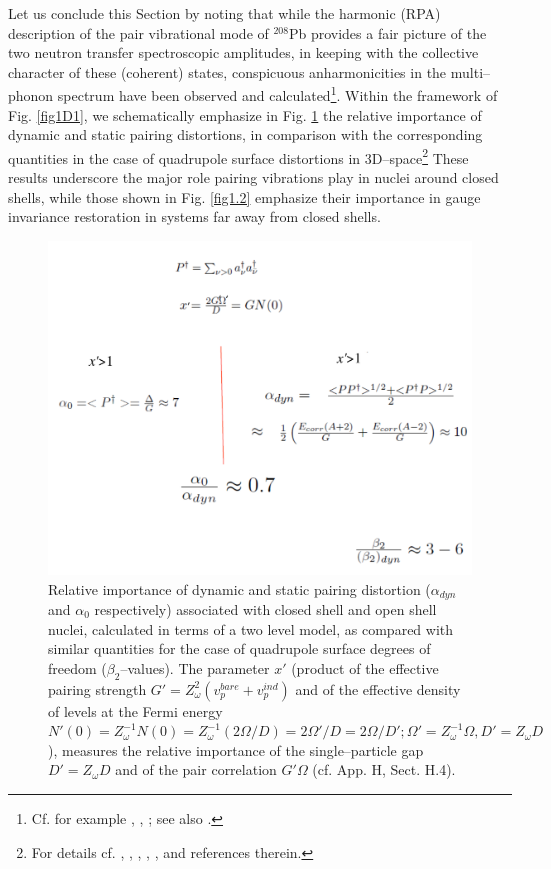 Let us conclude this Section by noting that while the harmonic (RPA) description of the pair vibrational mode of $^{208}$Pb provides a fair picture of the two neutron transfer spectroscopic amplitudes, in keeping with the collective character of these (coherent) states, conspicuous anharmonicities in the multi--phonon spectrum have been observed and calculated\footnote{Cf. for example \cite{Flynn:72}, \cite{Lanford:73}, \cite{Bortignon:78}; see also \cite{Clark:06}.}. Within the framework of Fig. \ref{fig1D1}, we schematically emphasize in Fig. \ref{fig1_E8} the relative importance of dynamic and static pairing distortions, in comparison with the corresponding quantities in the case of quadrupole surface distortions in 3D--space\footnote{For details cf. \cite{Bes:77}, \cite{Broglia:68}, \cite{Bes:88},\cite{Barranco:87a} \cite{Shimizu:89}, \cite{Shimizu:13}, \cite{Vaquero:13} and references therein.}  These results underscore the major role pairing vibrations play in nuclei around closed shells, while those shown in Fig. \ref{fig1.2} emphasize their importance in gauge invariance restoration in systems far away from closed shells.
  \begin{figure}
  \centerline{\includegraphics*[width=\textwidth,angle=0]{nutshell/figs/fig1E8.pdf}}
  \caption{Relative importance of dynamic and static pairing distortion ($\alpha_{dyn}$ and $\alpha_0$ respectively) associated with closed shell and open shell  nuclei, calculated in terms of a two level model, as compared with similar quantities for the case of quadrupole surface degrees of freedom ($\beta_2$--values). The parameter $x'$ (product of the effective pairing strength $G'=Z_\omega^2(v_p^{bare}+v_p^{ind})$ and of the effective density of levels at the Fermi energy $N'(0)=Z_\omega^{-1}N(0)=Z^{-1}_\omega(2\Omega/D)=2\Omega'/D=2\Omega/D';\Omega'=Z_\omega^{-1}\Omega,D'=Z_\omega D$), measures the relative importance of the single--particle gap $D'=Z_\omega D$ and of the pair correlation $G'\Omega$ (cf. \cite{Brink:05} App. H, Sect. H.4).}\label{fig1_E8}
  \end{figure}
